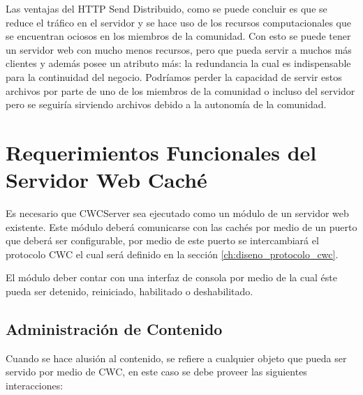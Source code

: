 Las ventajas del HTTP Send Distribuido, como se puede concluir es que se reduce el tráfico en el servidor y se hace uso de los recursos computacionales que se encuentran ociosos en los miembros de la comunidad. Con esto se puede tener un servidor web con mucho menos recursos, pero que pueda servir a muchos más clientes y además posee un atributo más: la redundancia la cual es indispensable para la continuidad del negocio. Podríamos perder la capacidad de servir estos archivos por parte de uno de los miembros de la comunidad o incluso del servidor pero se seguiría sirviendo archivos debido a la autonomía de la comunidad. 


\section{Requerimientos Funcionales del Servidor Web Caché}

Es necesario que CWCServer sea ejecutado como un módulo de un servidor web existente. Este módulo deberá comunicarse con las cachés por medio de un puerto que deberá ser configurable, por medio de este puerto se intercambiará el protocolo CWC el cual será definido en la sección \ref{ch:diseno_protocolo_cwc}. 

El módulo deber contar con una interfaz de consola por medio de la cual éste pueda ser detenido, reiniciado, habilitado o deshabilitado.

\subsection{Administración de Contenido}

Cuando se hace alusión al contenido, se refiere a cualquier objeto que pueda ser servido por medio de CWC, en este caso se debe proveer las siguientes interacciones:

